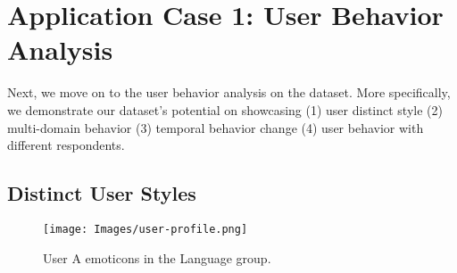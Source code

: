 

\section{Application Case 1: User Behavior Analysis}

Next, we move on to the user behavior analysis on the dataset. More specifically, we demonstrate our dataset's potential on showcasing (1) user distinct style (2) multi-domain behavior (3) temporal behavior change (4) user behavior with different respondents.

\subsection{Distinct User Styles}


\begin{figure}[htbp] 
    \centering \texttt{[image: Images/user-profile.png]} 
    \caption{User A emoticons in the Language group.} 
\label{fig:emoticon-user-profile-A} 
\end{figure}

